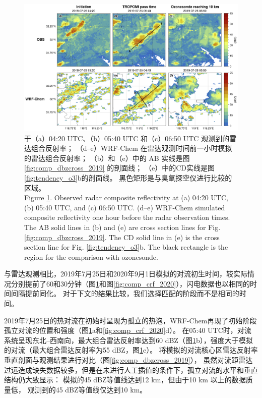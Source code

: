 \begin{figure}[H]
\centering
\includegraphics[width=\textwidth]{./figures/comp_crf_2019.png}
\caption{于（a）04:20 UTC、（b）05:40 UTC 和（c）06:50 UTC 观测到的雷达组合反射率；
         （d--e）WRF-Chem 在雷达观测时间前一小时模拟的雷达组合反射率；
         （b）和（e）中的 AB 实线是图 \ref{fig:comp_dbzcross_2019} 的剖面线；
         （e）中的CD实线是图\ref{fig:tendency_o3}b的剖面线。
         黑色矩形是与臭氧探空仪进行比较的区域。\\
         Figure \ref{fig:comp_crf_2019}. Observed radar composite reflectivity at (a) 04:20 UTC, (b) 05:40 UTC, and (c) 06:50 UTC.
        (d--e) WRF-Chem simulated composite reflectivity one hour before the radar observation times.
        The AB solid lines in (b) and (e) are cross section lines for Fig. \ref{fig:comp_dbzcross_2019}.
        The CD solid line in (e) is the cross section line for Fig. \ref{fig:tendency_o3}b.
        The black rectangle is the region for the comparison with ozonesonde.}
\label{fig:comp_crf_2019}
\end{figure}


与雷达观测相比，2019年7月25日和2020年9月1日模拟的对流初生时间，较实际情况分别提前了60和30分钟（图\ref{fig:comp_crf_2019}和图\ref{fig:comp_crf_2020}），闪电数据也以相同的时间间隔提前同化。
对于下文的结果比较，我们选择匹配的阶段而不是相同的时间。

2019年7月25日的热对流在初始时呈现为孤立的热泡，WRF-Chem再现了初始阶段孤立对流的位置和强度（图\ref{fig:comp_crf_2019}a和\ref{fig:comp_crf_2020}d）。
在05:40 UTC时，对流系统呈现东北--西南向，最大组合雷达反射率达到60 dBZ（图\ref{fig:comp_crf_2019}b），强度大于模拟的对流（最大组合雷达反射率为55 dBZ，图\ref{fig:comp_crf_2019}e）。
将模拟的对流核心区雷达反射率垂直剖面与观测结果进行对比（图\ref{fig:comp_dbzcross_2019}），
虽然对流距雷达过远造成缺失数据较多，但是在未进行人工插值的条件下，孤立对流的水平和垂直结构仍大致显示：
模拟的45 dBZ等值线达到12 km，但由于10 km 以上的数据质量低，
观测到的45 dBZ等值线仅达到10 km。

